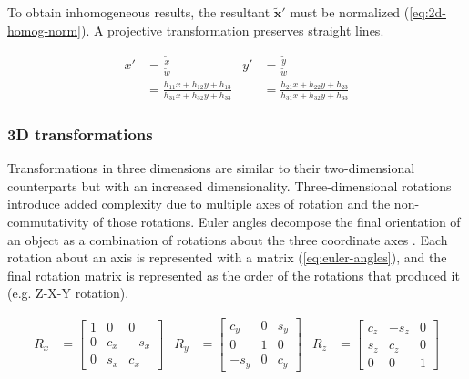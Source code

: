 To obtain inhomogeneous results, the resultant $\tilde{\mathbf{x}}'$ must be normalized (\cref{eq:2d-homog-norm}).
A projective transformation preserves straight lines.

\begin{equation}
    \begin{aligned}
        x'&= \frac{\tilde{x}}{\tilde{w}}  &  y' &= \frac{\tilde{y}}{\tilde{w}}\\
        &= \frac{h_{11}x + h_{12}y + h_{13}}{h_{31}x + h_{32}y + h_{33}} &  &= \frac{h_{21}x + h_{22}y + h_{23}}{h_{31}x + h_{32}y + h_{33}}
    \end{aligned}
    \label{eq:2d-homog-norm}
\end{equation}


\subsubsection{3D transformations}
\label{sec:3d-transformations}
Transformations in three dimensions are similar to their two-dimensional counterparts but with an increased dimensionality.
Three-dimensional rotations introduce added complexity due to multiple axes of rotation and the non-commutativity of those rotations.
Euler angles decompose the final orientation of an object as a combination of rotations about the three coordinate axes \cite{groodJointCoordinateSystem1983}.
Each rotation about an axis is represented with a matrix (\cref{eq:euler-angles}), and the final rotation matrix is represented as the order of the rotations that produced it (e.g. Z-X-Y rotation).

\begin{equation}
    \begin{aligned}
        R_{x} &= \begin{bmatrix}
            1 & 0 & 0 \\ 0 & c_x & -s_x \\ 0 & s_x & c_x
        \end{bmatrix}
        &R_{y} &= \begin{bmatrix}
            c_y & 0 & s_y \\ 0 & 1 & 0 \\ -s_y & 0 & c_y
        \end{bmatrix}
        &R_{z} &= \begin{bmatrix}
            c_z & -s_z & 0 \\ s_z & c_z & 0 \\ 0 & 0 & 1
        \end{bmatrix} \\
    \end{aligned}
    \label{eq:euler-angles}
\end{equation}

